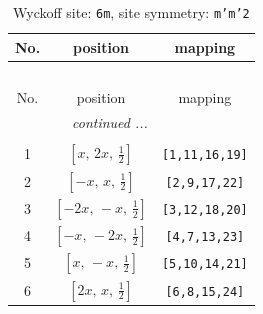 \documentclass[fleqn,8pt]{jsarticle}
\begin{document}
\renewcommand{\arraystretch}{1.2}
\begin{longtable}{ccc}
\caption{Wyckoff site: {\tt 6m}, site symmetry: {\tt m'm'2}}
 \\
 \hline \hline
No. & position & mapping \\ \hline \endfirsthead

\multicolumn{2}{l}{\tablename\ \thetable{}} \\
 \hline \hline
No. & position & mapping \\ \hline \endhead

 \hline \hline
\multicolumn{2}{r}{\footnotesize\it continued ...} \\ \endfoot

 \hline \hline
\multicolumn{2}{r}{} \\ \endlastfoot

1 & $\left[ x,\, 2 x,\, \frac{1}{2} \right]$ & {\tt [1,11,16,19]} \\ \hline
2 & $\left[ - x,\, x,\, \frac{1}{2} \right]$ & {\tt [2,9,17,22]} \\ \hline
3 & $\left[ - 2 x,\, - x,\, \frac{1}{2} \right]$ & {\tt [3,12,18,20]} \\ \hline
4 & $\left[ - x,\, - 2 x,\, \frac{1}{2} \right]$ & {\tt [4,7,13,23]} \\ \hline
5 & $\left[ x,\, - x,\, \frac{1}{2} \right]$ & {\tt [5,10,14,21]} \\ \hline
6 & $\left[ 2 x,\, x,\, \frac{1}{2} \right]$ & {\tt [6,8,15,24]} \\
\end{longtable}
\renewcommand{\arraystretch}{1.2}
\end{document}
